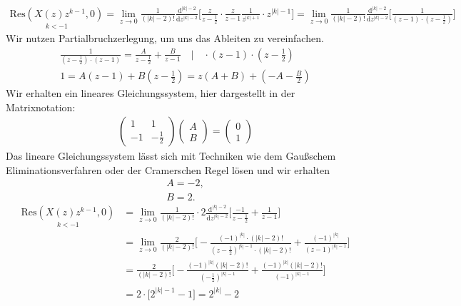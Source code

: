 \begin{align}
	\underset{k<-1}{\mathrm{Res}(X(z)z^{k-1},0)}=\lim\limits_{z\rightarrow0}\frac{1}{(|k|-2)!}\frac{\mathrm{d}^{|k|-2}}{\mathrm{d}z^{|k|-2}}\Bigg [\frac{z}{z-\frac{1}{2}}\cdot\frac{z}{z-1}\frac{1}{z^{|k|+1}}\cdot z^{|k|-1}\Bigg]=\lim\limits_{z\rightarrow0}\frac{1}{(|k|-2)!}\frac{\mathrm{d}^{|k|-2}}{\mathrm{d}z^{|k|-2}}\Bigg [\frac{1}{(z-1)\cdot(z-\frac{1}{2})}\Bigg]
\end{align}
Wir nutzen Partialbruchzerlegung, um uns das Ableiten zu vereinfachen.
\begin{align}
	\frac{1}{(z-\frac{1}{2})\cdot(z-1)}=\frac{A}{z-\frac{1}{2}}+\frac{B}{z-1}\quad \Bigg | \quad \cdot(z-1)\cdot(z-\frac{1}{2}) \nonumber \\
	1 = A(z-1)+B(z-\frac{1}{2})=z(A+B)+(-A-\frac{B}{2})
\end{align}
Wir erhalten ein lineares Gleichungssystem, hier dargestellt in der Matrixnotation:
\begin{align}
	\begin{pmatrix}
		1 & 1 \\
		-1 & -\frac{1}{2}
	\end{pmatrix}
	\begin{pmatrix}
		A \\
		B
	\end{pmatrix}
	=
	\begin{pmatrix}
		0 \\
		1
	\end{pmatrix}
\end{align}
Das lineare Gleichungssystem lässt sich mit Techniken wie dem Gaußschem Eliminationsverfahren oder der Cramerschen Regel lösen und wir erhalten
\begin{align}
	A = -2, \nonumber \\
	B = 2.
\end{align}
\begin{align}
	\underset{k<-1}{\mathrm{Res}(X(z)z^{k-1},0)}&=\lim\limits_{z\rightarrow0}\frac{1}{(|k|-2)!}\cdot2\frac{\mathrm{d}^{|k|-2}}{\mathrm{d}z^{|k|-2}}\Bigg [\frac{-1}{z-\frac{1}{2}}+\frac{1}{z-1}\Bigg]\nonumber \\
	&=\lim\limits_{z\rightarrow0}\frac{2}{(|k|-2)!}\Bigg [-\frac{(-1)^{|k|}\cdot(|k|-2)!}{(z-\frac{1}{2})^{|k|-1}\cdot(|k|-2)!}+\frac{(-1)^{|k|}}{(z-1)^{|k|-1}}\Bigg] \nonumber \\
	&=\frac{2}{(|k|-2)!}\Bigg [-\frac{(-1)^{|k|}(|k|-2)!}{(-\frac{1}{2})^{|k|-1}}+\frac{(-1)^{|k|}(|k|-2)!}{(-1)^{|k|-1}}\Bigg] \nonumber \\
	&=2\cdot \Bigg [2^{|k|-1}-1\Bigg]=2^{|k|}-2
\end{align}
